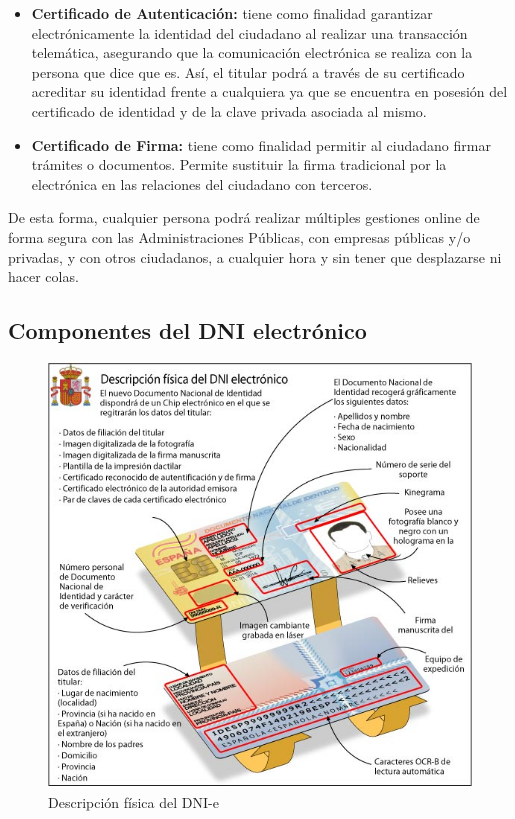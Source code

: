 \documentclass{manual}
\begin{document}
\begin{itemize}
	\item \textbf{Certificado de Autenticación:} tiene como finalidad garantizar electrónicamente la identidad del ciudadano al realizar una transacción telemática, asegurando que la comunicación electrónica se realiza con la persona que dice que es. Así, el titular podrá a través de su certificado acreditar su identidad frente a cualquiera ya que se encuentra en posesión del certificado de identidad y de la clave privada asociada al mismo.
		
	\item \textbf{Certificado de Firma:} tiene como finalidad permitir al ciudadano firmar trámites o documentos. Permite sustituir la firma tradicional por la electrónica en las relaciones del ciudadano con terceros.
\end{itemize}
	

De esta forma, cualquier persona podrá realizar múltiples gestiones online de forma segura con las Administraciones Públicas, con empresas públicas y/o privadas, y con otros ciudadanos, a cualquier hora y sin tener que desplazarse ni hacer colas.


\subsection{Componentes del DNI electrónico}

\begin{figure}[H]
	\centering
	\includegraphics[width=120mm]{images/dnie_descrip}
	\caption{Descripción física del DNI-e} 
	\label{componentes}
\end{figure}
\end{document}
